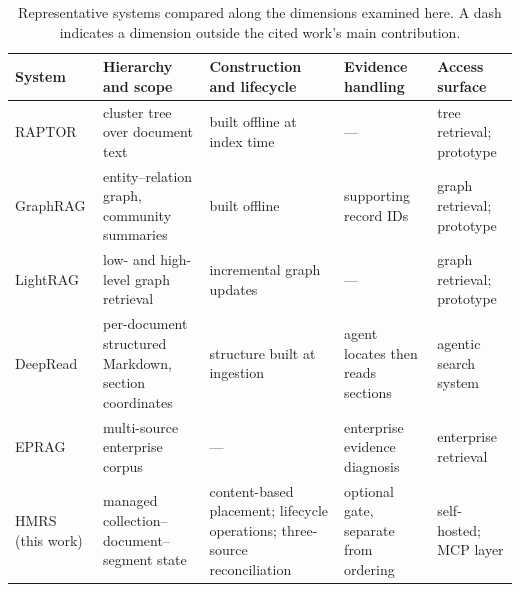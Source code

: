 \begin{table}[!t]
\centering
\small
\setlength{\tabcolsep}{3.5pt}
\renewcommand{\arraystretch}{1.02}
\caption{Representative systems compared along the dimensions examined here.
A dash indicates a dimension outside the cited work's main contribution.}
\label{tab:related-comparison}
\begin{tabular}{@{}>{\raggedright\arraybackslash}p{}>{\raggedright\arraybackslash}p{}>{\raggedright\arraybackslash}p{}>{\raggedright\arraybackslash}p{}>{\raggedright\arraybackslash}p{}@{}}
\toprule
System & Hierarchy and scope & Construction and lifecycle & Evidence handling & Access surface\\
\midrule
RAPTOR \citep{raptor} & cluster tree over document text & built offline at index time & --- & tree retrieval; prototype\\
GraphRAG \citep{graphrag} & entity--relation graph, community summaries & built offline & supporting record IDs & graph retrieval; prototype\\
LightRAG \citep{lightrag} & low- and high-level graph retrieval & incremental graph updates & --- & graph retrieval; prototype\\
DeepRead \citep{deepread} & per-document structured Markdown, section coordinates & structure built at ingestion & agent locates then reads sections & agentic search system\\
EPRAG \citep{kinalioglu-kbs-eprag-2026} & multi-source enterprise corpus & --- & enterprise evidence diagnosis & enterprise retrieval\\
HMRS (this work) & managed collection--document--segment state & content-based placement; lifecycle operations; three-source reconciliation & optional gate, separate from ordering & self-hosted; MCP layer\\
\bottomrule
\end{tabular}
\end{table}


